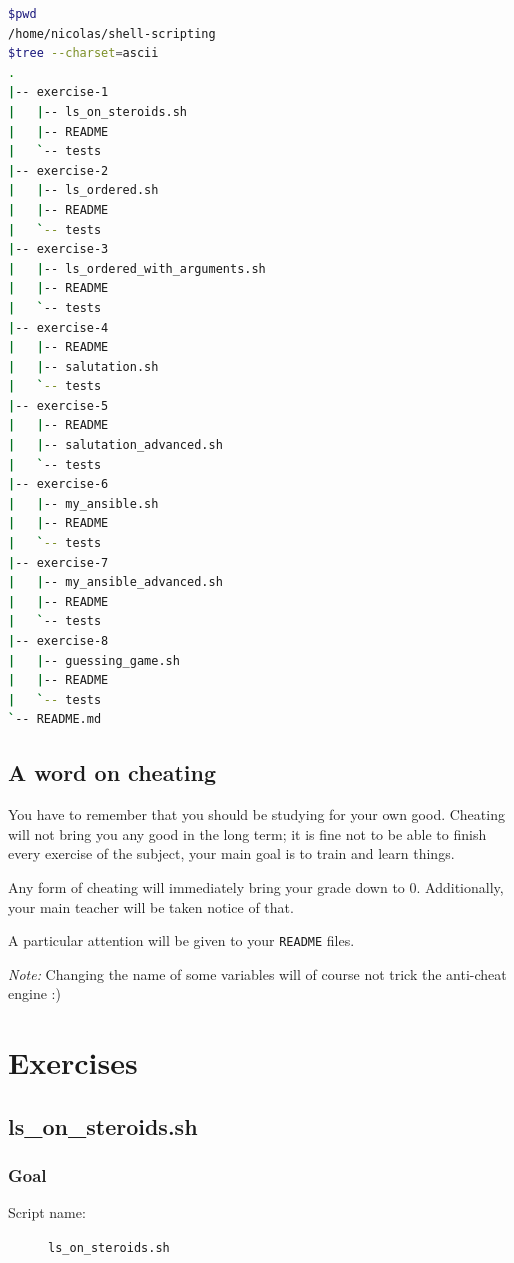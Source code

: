 \documentclass[12pt]{article}
\begin{document}
\begin{lstlisting}[language=bash]
$pwd
/home/nicolas/shell-scripting
$tree --charset=ascii
.
|-- exercise-1
|   |-- ls_on_steroids.sh
|   |-- README
|   `-- tests
|-- exercise-2
|   |-- ls_ordered.sh
|   |-- README
|   `-- tests
|-- exercise-3
|   |-- ls_ordered_with_arguments.sh
|   |-- README
|   `-- tests
|-- exercise-4
|   |-- README
|   |-- salutation.sh
|   `-- tests
|-- exercise-5
|   |-- README
|   |-- salutation_advanced.sh
|   `-- tests
|-- exercise-6
|   |-- my_ansible.sh
|   |-- README
|   `-- tests
|-- exercise-7
|   |-- my_ansible_advanced.sh
|   |-- README
|   `-- tests
|-- exercise-8
|   |-- guessing_game.sh
|   |-- README
|   `-- tests
`-- README.md
\end{lstlisting}

\subsection{A word on cheating}

You have to remember that you should be studying for your own good. Cheating will not bring you any good in the long term; it is fine not to be able to finish every exercise of the subject, your main goal is to train and learn things.

Any form of cheating will immediately bring your grade down to 0. Additionally, your main teacher will be taken notice of that.

A particular attention will be given to your \texttt{README} files.

\textit{Note:} Changing the name of some variables will of course not trick the anti-cheat engine :)

\section{Exercises}

\subsection{ls\_on\_steroids.sh}

\subsubsection{Goal}

\begin{description}
        \item[Script name:] \texttt{ls\_on\_steroids.sh}
\end{description}
\end{document}
